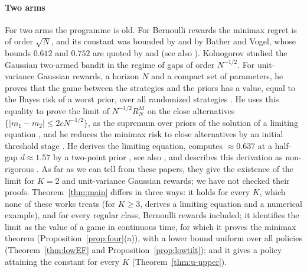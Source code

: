 \documentclass[11pt]{article}
\newcommand{\1}{\mathbf{1}}
\begin{document}
\paragraph{Two arms} For two arms the programme is old. For Bernoulli rewards the minimax regret is of order $\sqrt N$, and its constant was
bounded by \citet{FvZ70} and by Bather and Vogel, whose bounds $0.612$ and $0.752$ are quoted by \citet[Theorem~1]{KNS17} and \citet[(3)]{Kol17} (see
also \citealp{Vog60,Bat83}). Kolnogorov studied the Gaussian two-armed bandit in
the regime of gaps of order $N^{-1/2}$. For unit-variance Gaussian rewards, a horizon $N$ and a compact set of parameters, he proves that the game
between the strategies and the priors has a value, equal to the Bayes risk of a worst prior, over all randomized strategies
\citep[Theorem~1]{Kol11}. He uses this equality to prove the limit of $N^{-1/2}R^M_N$ on the close alternatives $\{|m_1-m_2|\le2cN^{-1/2}\}$, as the
supremum over priors of the solution of a limiting equation \citep[Theorem~3]{Kol14}, and he reduces the minimax risk to close alternatives by an initial
threshold stage \citep[Section~2, Theorem~2 and Corollary~1]{Kol20}. He derives the limiting equation, computes $\approx0.637$ at a half-gap $d\approx1.57$
by a two-point prior \citep[Theorems~1--3 and~(21)]{Kol17}, see also \citet{Kol16}, and describes this derivation as non-rigorous \citep{Kol15,Kol20}. As far as
we can tell from these papers, they give the existence of the limit for $K=2$ and unit-variance Gaussian rewards; we have not checked their
proofs. Theorem~\ref{thm:main} differs in three ways: it holds for every $K$, which none of these works treats (for $K\ge3$, \citealp{Kol25} derives a
limiting equation and a numerical example), and for every regular class, Bernoulli rewards included; it identifies the limit as the value of a game in
continuous time, for which it proves the minimax theorem (Proposition~\ref{prop:four}(a)), with a lower bound uniform over all policies
(Theorem~\ref{thm:lowEF} and Proposition~\ref{prop:lowtilt}); and it gives a policy attaining the constant for every $K$ (Theorem~\ref{thm:u-upper}).
\end{document}
